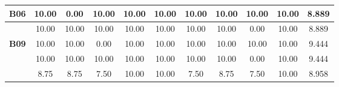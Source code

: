 \begin{table}[htbp]
\begin{tabular}{c|cccccccccc|}
		\multicolumn{1}{|c|}{\textbf{B06}} & \multicolumn{1}{c|}{10.00} & \multicolumn{1}{c|}{0.00} & \multicolumn{1}{c|}{10.00} & \multicolumn{1}{c|}{10.00} & \multicolumn{1}{c|}{10.00} & \multicolumn{1}{c|}{10.00} & \multicolumn{1}{c|}{10.00} & \multicolumn{1}{c|}{10.00} & \multicolumn{1}{c|}{10.00} & 8.889 \\ \hline
		\rowcolor[HTML]{F2F2F2} 
		\multicolumn{1}{|c|}{\cellcolor[HTML]{F2F2F2}\textbf{B08}} & \multicolumn{1}{c|}{\cellcolor[HTML]{F2F2F2}10.00} & \multicolumn{1}{c|}{\cellcolor[HTML]{F2F2F2}10.00} & \multicolumn{1}{c|}{\cellcolor[HTML]{F2F2F2}10.00} & \multicolumn{1}{c|}{\cellcolor[HTML]{F2F2F2}10.00} & \multicolumn{1}{c|}{\cellcolor[HTML]{F2F2F2}10.00} & \multicolumn{1}{c|}{\cellcolor[HTML]{F2F2F2}10.00} & \multicolumn{1}{c|}{\cellcolor[HTML]{F2F2F2}10.00} & \multicolumn{1}{c|}{\cellcolor[HTML]{F2F2F2}0.00} & \multicolumn{1}{c|}{\cellcolor[HTML]{F2F2F2}10.00} & 8.889 \\ \hline
		\multicolumn{1}{|c|}{\textbf{B09}} & \multicolumn{1}{c|}{10.00} & \multicolumn{1}{c|}{10.00} & \multicolumn{1}{c|}{0.00} & \multicolumn{1}{c|}{10.00} & \multicolumn{1}{c|}{10.00} & \multicolumn{1}{c|}{10.00} & \multicolumn{1}{c|}{10.00} & \multicolumn{1}{c|}{10.00} & \multicolumn{1}{c|}{10.00} & 9.444 \\ \hline
		\rowcolor[HTML]{F2F2F2} 
		\multicolumn{1}{|c|}{\cellcolor[HTML]{F2F2F2}\textbf{B10}} & \multicolumn{1}{c|}{\cellcolor[HTML]{F2F2F2}10.00} & \multicolumn{1}{c|}{\cellcolor[HTML]{F2F2F2}10.00} & \multicolumn{1}{c|}{\cellcolor[HTML]{F2F2F2}10.00} & \multicolumn{1}{c|}{\cellcolor[HTML]{F2F2F2}10.00} & \multicolumn{1}{c|}{\cellcolor[HTML]{F2F2F2}10.00} & \multicolumn{1}{c|}{\cellcolor[HTML]{F2F2F2}10.00} & \multicolumn{1}{c|}{\cellcolor[HTML]{F2F2F2}10.00} & \multicolumn{1}{c|}{\cellcolor[HTML]{F2F2F2}0.00} & \multicolumn{1}{c|}{\cellcolor[HTML]{F2F2F2}10.00} & 9.444 \\ \hline
		\rowcolor[HTML]{D0CECE} 
		\multicolumn{1}{|c|}{\cellcolor[HTML]{D0CECE}\textbf{Média}} & \multicolumn{1}{c|}{\cellcolor[HTML]{D0CECE}8.75} & \multicolumn{1}{c|}{\cellcolor[HTML]{D0CECE}8.75} & \multicolumn{1}{c|}{\cellcolor[HTML]{D0CECE}7.50} & \multicolumn{1}{c|}{\cellcolor[HTML]{D0CECE}10.00} & \multicolumn{1}{c|}{\cellcolor[HTML]{D0CECE}10.00} & \multicolumn{1}{c|}{\cellcolor[HTML]{D0CECE}7.50} & \multicolumn{1}{c|}{\cellcolor[HTML]{D0CECE}8.75} & \multicolumn{1}{c|}{\cellcolor[HTML]{D0CECE}7.50} & \multicolumn{1}{c|}{\cellcolor[HTML]{D0CECE}10.00} & 8.958 \\ \hline
	\end{tabular}
	\label{tab:F3_A2_NT_CASO_BINARIO_}
\end{table}

